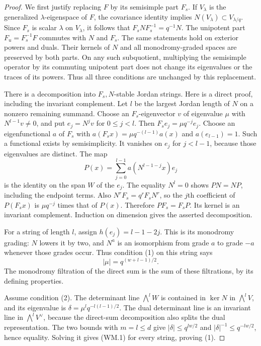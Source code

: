 \documentclass[11pt,a4paper]{article}
\theoremstyle{definition}\newtheorem{definition}[theorem]{Definition}
\theoremstyle{remark}\newtheorem{remark}[theorem]{Remark}
\begin{document}
\begin{proof}
We first justify replacing $F$ by its semisimple part $F_s$.
If $V_\lambda$ is the generalized $\lambda$-eigenspace of $F$,
the covariance identity implies
$N(V_\lambda)\subset V_{\lambda/q}$.
Since $F_s$ is scalar $\lambda$ on $V_\lambda$, it follows
that $F_sNF_s^{-1}=q^{-1}N$. The unipotent part
$F_u=F_s^{-1}F$ commutes with $N$ and $F_s$.
The same statements hold on exterior powers and duals.
Their kernels of $N$ and all monodromy-graded spaces are
preserved by both parts. On any such subquotient, multiplying
the semisimple operator by its commuting unipotent part
does not change its eigenvalues or the traces of its powers.
Thus all three conditions are unchanged by this replacement.

There is a decomposition into $F_s,N$-stable Jordan strings.
Here is a direct proof, including the invariant complement.
Let $l$ be the largest Jordan length of $N$ on a nonzero
remaining summand. Choose an $F_s$-eigenvector $v$ of
eigenvalue $\mu$ with $N^{l-1}v\ne0$, and put
$e_j=N^jv$ for $0\leq j<l$.
Then $F_se_j=\mu q^{-j}e_j$. Choose an eigenfunctional
$a$ of $F_s$ with
$a(F_sx)=\mu q^{-(l-1)}a(x)$ and $a(e_{l-1})=1$.
Such a functional exists by semisimplicity. It vanishes
on $e_j$ for $j<l-1$, because those eigenvalues are distinct.
The map
\[
 P(x)=\sum_{j=0}^{l-1}a(N^{l-1-j}x)e_j
\]
is the identity on the span $W$ of the $e_j$.
The equality $N^l=0$ shows $PN=NP$, including the endpoint
terms. Also $N^rF_s=q^rF_sN^r$, so the $j$th coefficient
of $P(F_sx)$ is $\mu q^{-j}$ times that of $P(x)$.
Therefore $PF_s=F_sP$. Its kernel is an invariant
complement. Induction on dimension gives the asserted
decomposition.

For a string of length $l$, assign
$h(e_j)=l-1-2j$. This is its monodromy grading:
$N$ lowers it by two, and $N^a$ is an isomorphism from
grade $a$ to grade $-a$ whenever those grades occur.
Thus condition (1) on this string says
\[
       |\mu|=q^{(w+l-1)/2}.                         \tag{WM.1}
\]
The monodromy filtration of the direct sum is the sum
of these filtrations, by its defining properties.

Assume condition (2). The determinant line
$\bigwedge^lW$ is contained in $\ker N$ in
$\bigwedge^lV$, and its eigenvalue is
$\delta=\mu^l q^{-l(l-1)/2}$.
The dual determinant line is an invariant line in
$\bigwedge^lV^\vee$, because the direct-sum decomposition
also splits the dual representation. The two bounds with
$m=l\leq d$ give
$|\delta|\leq q^{lw/2}$ and
$|\delta|^{-1}\leq q^{-lw/2}$, hence equality.
Solving it gives (WM.1) for every string, proving (1).


\end{proof}
\end{document}
